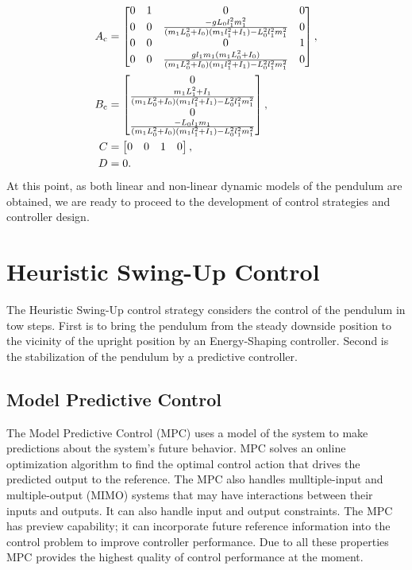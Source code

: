 \newpage
\begin{subequations}\label{linmatrices}
	\begin{align}
	A _{\text{c}} &=\begin{bmatrix}0&1&0&0\\
	0&0&\frac{-gL_0l_1^2m_1^2}{(m_1L_0^2+I_0)(m_1l_1^2+I_1)-L_0^2l_1^2m_1^2}&0\\
	0&0&0&1\\
	0&0&\frac{gl_1m_1(m_1L_0^2+I_0)}{(m_1L_0^2+I_0)(m_1l_1^2+I_1)-L_0^2l_1^2m_1^2}&0
	\end{bmatrix},\\
	B _{\text{c}} &=	\begin{bmatrix}
	0\\ 
	\frac{m_1L_1^2+I_1}{(m_1L_0^2+I_0)(m_1l_1^2+I_1)-L_0^2l_1^2m_1^2}\\
	0\\
	\frac{-L_0l_1m_1}{(m_1L_0^2+I_0)(m_1l_1^2+I_1)-L_0^2l_1^2m_1^2}
	\end{bmatrix},\\
	C &= \begin{bmatrix}0&0&1&0\end{bmatrix},\\
	D &= 0.
	\end{align}
\end{subequations}
At this point, as both linear and non-linear dynamic models of the pendulum are obtained, we are ready to proceed to the development of control strategies and controller design.
\section{Heuristic Swing-Up Control}\label{Hswing:teoria}
The Heuristic Swing-Up control strategy considers the control of the pendulum in tow steps. First is to bring the pendulum from the steady downside position to the vicinity of the upright position by an Energy-Shaping controller. Second is the stabilization of the pendulum by a predictive controller.
\subsection{Model Predictive Control}\label{mpcsection}
The Model Predictive Control (MPC) uses a model of the system to make predictions about the system’s future behavior. MPC solves an online optimization algorithm to find the optimal control action that drives the predicted output to the reference. The MPC also handles mulltiple-input and multiple-output (MIMO) systems that may have interactions between their inputs and outputs. It can also handle input and output constraints. The MPC has preview capability; it can incorporate future reference information into the control problem to improve controller performance. Due to all these properties MPC provides the highest quality of control performance at the moment.
